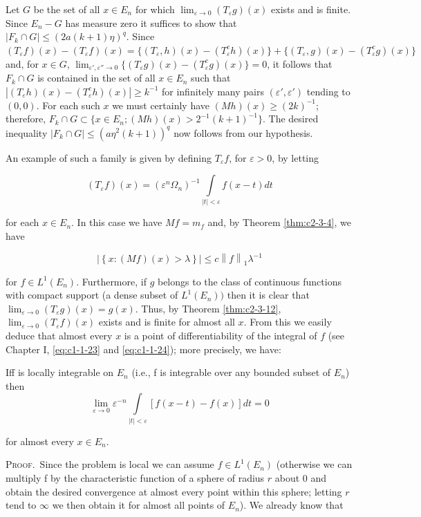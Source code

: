 Let $G$ be the set of all $x \in E_n$ for which $\lim_{\varepsilon \to 0} (T_\varepsilon g)(x)$ exists and is finite. Since $E_n - G$ has measure zero it suffices to show that $|F_k \cap G| \leq (2a(k + 1)\eta)^q$. Since $(T_\varepsilon f)(x) - (T_\varepsilon f)(x) = \{(T_\varepsilon, h)(x) - (T_\varepsilon^c h)(x)\} + \{(T_\varepsilon, g)(x) - (T_\varepsilon^c g)(x)\}$ and, for $x \in G$, $\lim_{\varepsilon', \varepsilon'' \to 0} \{(T_\varepsilon g)(x) - (T_\varepsilon^c g)(x)\} = 0$, it follows that $F_k \cap G$ is contained in the set of all $x \in E_n$ such that $|(T_\varepsilon h)(x) - (T_\varepsilon^c h)(x)| \geq k^{-1}$ for infinitely many pairs $(\varepsilon', \varepsilon')$ tending to $(0, 0)$. For each such $x$ we must certainly have $(Mh)(x) \geq (2k)^{-1}$; therefore, $F_k \cap G \subset \{x \in E_n; (Mh)(x) > 2^{-1}(k + 1)^{-1}\}$. The desired inequality $|F_k \cap G| \leq (a\eta^2(k + 1))^q$ now follows from our hypothesis.

An example of such a family is given by defining $T_{\varepsilon}f$, for $\varepsilon>0$, by letting

\[
(T_{\varepsilon}f)(x)=(\varepsilon^{n}\Omega_{n})^{-1}\int\limits_{|t|<\varepsilon}f(x-t)d t
\]

for each $x \in E_n$. In this case we have $Mf = m_f$ and, by Theorem \ref{thm:c2-3-4}, we have

\[
\left|\left\{x:\left(M f\right)(x)>\lambda\right\}\right|\leq c\left\|f\right\|_{1}\lambda^{-1}
\]

for $f\in L^{1}(E_{n})$. Furthermore, if $g$ belongs to the class of continuous functions with compact support (a dense subset of $L^{1}(E_{n}))$ then it is clear that $\lim_{\varepsilon\to0}(T_{\varepsilon}g)(x)=g(x)$. Thus, by Theorem \ref{thm:c2-3-12}, $\lim_{\varepsilon\to0}(T_{\varepsilon}f)(x)$ exists and is finite for almost all $x$. From this we easily deduce that almost every $x$ is a point of differentiability of the integral of $f$ (see Chapter I, \eqref{eq:c1-1-23} and \eqref{eq:c1-1-24}); more precisely, we have:

\begin{corollary}
\label{cor:c2-3-14}
Iff is locally integrable on $E_{n}$ (i.e., f is integrable over any bounded subset of $E_{n}$) then
\[
\lim_{\varepsilon\to0}\varepsilon^{-n}\int\limits_{|t|<\varepsilon}\left[f(x-t)-f(x)\right]d t=0
\]

for almost every $x \in E_n$.
\end{corollary}

\textsc{Proof.}\ Since the problem is local we can assume $f \in L^1(E_n)$ (otherwise we can multiply f by the characteristic function of a sphere of radius $r$ about 0 and obtain the desired convergence at almost every point within this sphere; letting $r$ tend to $\infty$ we then obtain it for almost all points of $E_n$). We already know that

